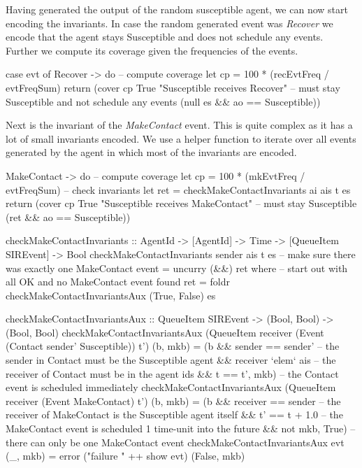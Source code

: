 Having generated the output of the random susceptible agent, we can now start encoding the invariants. In case the random generated event was \textit{Recover} we encode that the agent stays Susceptible and does not schedule any events. Further we compute its coverage given the frequencies of the events.

\begin{HaskellCode}
case evt of
  Recover -> do
    -- compute coverage
    let cp = 100 * (recEvtFreq / evtFreqSum)
    return (cover cp True "Susceptible receives Recover"
           -- must stay Susceptible and not schedule any events
           (null es && ao == Susceptible))
\end{HaskellCode}

Next is the invariant of the \textit{MakeContact} event. This is quite complex as it has a lot of small invariants encoded. We use a helper function to iterate over all events generated by the agent in which most of the invariants are encoded.

\begin{HaskellCode}
MakeContact -> do
  -- compute coverage
  let cp  = 100 * (mkEvtFreq / evtFreqSum)
  -- check invariants
  let ret = checkMakeContactInvariants ai ais t es
  return (cover cp True "Susceptible receives MakeContact" 
         -- must stay Susceptible 
         (ret && ao == Susceptible))
         
checkMakeContactInvariants :: AgentId -> [AgentId] -> Time -> [QueueItem SIREvent] -> Bool
checkMakeContactInvariants sender ais t es 
    -- make sure there was exactly one MakeContact event
    = uncurry (&&) ret
  where
    -- start out with all OK and no MakeContact event found
    ret = foldr checkMakeContactInvariantsAux (True, False) es

    checkMakeContactInvariantsAux :: QueueItem SIREvent -> (Bool, Bool) -> (Bool, Bool)
    checkMakeContactInvariantsAux 
        (QueueItem receiver (Event (Contact sender' Susceptible)) t') (b, mkb)
      = (b && sender == sender'    -- the sender in Contact must be the Susceptible agent
           && receiver `elem` ais  -- the receiver of Contact must be in the agent ids
           && t == t', mkb)        -- the Contact event is scheduled immediately
    checkMakeContactInvariantsAux 
        (QueueItem receiver (Event MakeContact) t') (b, mkb) 
      = (b && receiver == sender  -- the receiver of MakeContact is the Susceptible agent itself
           && t' == t + 1.0       -- the MakeContact event is scheduled 1 time-unit into the future
           && not mkb, True)      -- there can only be one MakeContact event
    checkMakeContactInvariantsAux evt (_, mkb) = error ("failure " ++ show evt) (False, mkb)
\end{HaskellCode}

